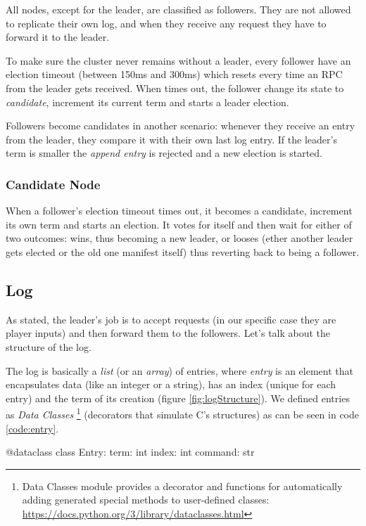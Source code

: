 All nodes, except for the leader, are classified as followers. They are not allowed to replicate their own log, and when they receive any request they have to forward it to the leader.

To make sure the cluster never remains without a leader, every follower have an election timeout (between 150ms and 300ms) which resets every time an RPC from the leader gets received. When times out, the follower change its state to \textit{candidate}, increment its current term and starts a leader election. 

Followers become candidates in another scenario: whenever they receive an entry from the leader, they compare it with their own last log entry. If the leader's term is smaller the \textit{append entry} is rejected and a new election is started. 

\subsubsection{Candidate Node}

When a follower's election timeout times out, it becomes a candidate, increment its own term and starts an election. It votes for itself and then wait for either of two outcomes: wins, thus becoming a new leader, or looses (ether another leader gets elected or the old one manifest itself) thus reverting back to being a follower.

\subsection{Log}

As stated, the leader's job is to accept requests (in our specific case they are player inputs) and then forward them to the followers. Let's talk about the structure of the log. 

The log is basically a \textit{list} (or an \textit{array}) of entries, where \textit{entry} is an element that encapsulates data (like an integer or a string), has an index (unique for each entry) and the term of its creation (figure \ref{fig:logStructure}). We defined entries as \textit{Data Classes} \footnote{Data Classes module provides a decorator and functions for automatically adding generated special methods to user-defined classes: \url{https://docs.python.org/3/library/dataclasses.html}} (decorators that simulate C's structures) as can be seen in code \ref{code:entry}.

\begin{python}[label={code:entry}, caption={Dataclass Entry definition}]
@dataclass
class Entry:
    term: int
    index: int
    command: str 
\end{python}

